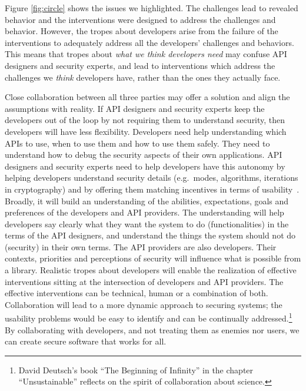 \documentclass[conference]{IEEEtran}
\begin{document}
Figure \ref{fig:circle} shows the issues we highlighted. The challenges lead to revealed behavior and the interventions were designed to address the challenges and behavior. However, the tropes about developers arise from the failure of the interventions to adequately address all the developers' challenges and behaviors.  This means that tropes about \emph{what we think developers need} may confuse API designers and security experts, and lead to interventions which address the challenges we \emph{think} developers have, rather than the ones they actually face.

Close collaboration between all three parties may offer a solution and  align the assumptions with reality. If API designers and security experts keep the developers out of the loop by not requiring them to understand security, then developers will have less flexibility. Developers need help understanding which APIs to use, when to use them and how to use them safely. They need to understand how to debug the security aspects of their own applications.  API designers and security experts need to help developers have this autonomy by helping developers understand security details (e.g.~modes, algorithms, iterations in cryptography) and by offering them matching incentives in terms of usability~\cite{aside2012,weir2020,tahaei2021sat}. Broadly, it will build an understanding of the abilities, expectations, goals and preferences of the developers and API providers. The understanding will help developers say clearly what they want the system to do (functionalities) in the terms of the API designers, and understand the things the system should not do (security) in their own terms.  The API providers are also developers. Their contexts, priorities and perceptions of security will influence what is possible from a library. Realistic tropes about developers will enable the realization of effective interventions sitting at the intersection of developers and API providers. The effective interventions can be technical, human or a combination of both. Collaboration will lead to a more dynamic approach to securing systems; the usability problems would be easy to identify and can be continually addressed.\footnote{David Deutsch's book ``The Beginning of Infinity'' in the chapter ``Unsustainable'' reflects on the spirit of collaboration about science.} By collaborating with developers, and not treating them as enemies nor users, we can create secure software that works for all.

\end{document}
